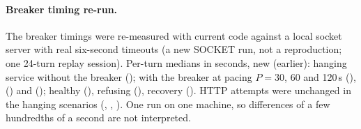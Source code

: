 \paragraph{Breaker timing re-run.} The breaker timings were re-measured with current code against a local socket server with real six-second timeouts (a new SOCKET run, not a reproduction; one 24-turn replay session). Per-turn medians in seconds, new (earlier): hanging service without the breaker \efivehangBnew{} (\efivehangBold{}); with the breaker at pacing $P{=}30$, 60 and 120\,s \efivehangSPthreezeronew{} (\efivehangSPthreezeroold{}), \efivehangSPsixzeronew{} (\efivehangSPsixzeroold{}) and \efivehangSPonetwozeronew{} (\efivehangSPonetwozeroold{}); healthy \efiveokSPsixzeronew{} (\efiveokSPsixzeroold{}), refusing \efiverefuseSPsixzeronew{} (\efiverefuseSPsixzeroold{}), recovery \efiverecoverSPsixzeronew{} (\efiverecoverSPsixzeroold{}). HTTP attempts were unchanged in the hanging scenarios (\efivehangBnewhttp{}, \efivehangSPthreezeronewhttp{}, \efivehangSPsixzeronewhttp{}). One run on one machine, so differences of a few hundredths of a second are not interpreted.

